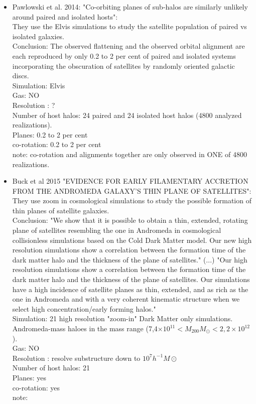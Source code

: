 \documentclass{emulateapj}
\begin{document}
\begin{itemize}
\item{ Pawlowski et al. 2014: "Co-orbiting planes of sub-halos are
similarly unlikely around paired and isolated hosts":\\
They use the Elvis simulations to study the satellite population of
paired vs isolated galaxies.\\
Conclusion: The observed flattening and the observed orbital alignment
are each reproduced by only 0.2 to 2 per cent of paired and isolated
systems incorporating the obscuration of satellites by randomly
oriented galactic discs.\\
Simulation: Elvis\\
Gas: NO\\
Resolution : ?\\
Number of host halos: 24 paired and 24 isolated host halos (4800
analyzed realizations).\\
Planes: 0.2 to 2 per cent\\
co-rotation: 0.2 to 2 per cent\\
note: co-rotation and alignments together are only observed in ONE of
4800 realizations.\\
}

\item{Buck et al 2015 "EVIDENCE FOR EARLY FILAMENTARY ACCRETION FROM THE ANDROMEDA GALAXY'S THIN PLANE
OF SATELLITES":\\
They use zoom in cosmological simulations to study the possible formation of thin planes of satellite galaxies.\\
Conclusion: "We show that it is possible to obtain a thin, extended, rotating plane of satellites resembling the one in
Andromeda in cosmological collisionless simulations based on the Cold Dark Matter model. Our new
high resolution simulations show a correlation between the formation time of the dark matter halo
and the thickness of the plane of satellites." (...) "Our high resolution simulations show a correlation between the formation time of the dark matter halo
and the thickness of the plane of satellites. Our simulations have a high incidence of satellite planes
as thin, extended, and as rich as the one in Andromeda and with a very coherent kinematic structure
when we select high concentration/early forming halos."\\
Simulation: 21 high resolution "zoom-in" Dark Matter only simulations. Andromeda-mass haloes in the mass range
(7,4$\times 10^{11} < M_{200}M_\odot < 2,2 \times 10^{12}$).\\
Gas: NO\\
Resolution : resolve substructure down to $10^7 h^{-1}M\odot$\\
Number of host halos: 21\\
Planes: yes\\
co-rotation: yes\\
note: \\
}


\end{itemize}
\end{document}
